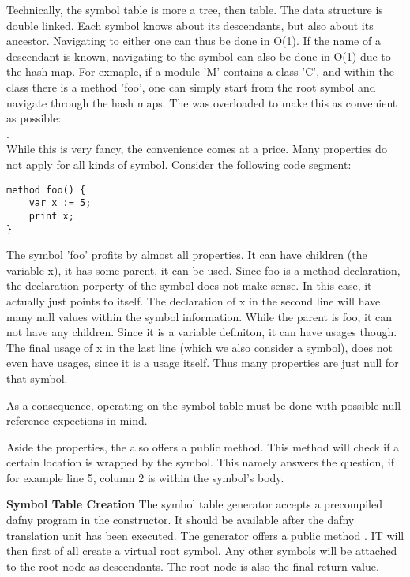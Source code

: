 Technically, the symbol table is more a tree, then table. The data structure is double linked. Each symbol knows about its descendants, but also about its ancestor. Navigating to either one can thus be done in O(1). If the name of a descendant is known, navigating to the symbol can also be done in O(1) due to the hash map. For exmaple, if a module 'M' contains a class 'C', and within the class there is a method 'foo', one can simply start from the root symbol and navigate through the hash maps. The \code{[]} was overloaded to make this as convenient as possible:\\
.\\

While this is very fancy, the convenience comes at a price. Many properties do not apply for all kinds of symbol. Consider the following code segment:

\begin{lstlisting}[language=dafny, caption={Example Code Regarding Symbol Information}, captionpos=b, label={lst:aldbkajds}]
method foo() {
    var x := 5;
    print x;
}
\end{lstlisting}

The symbol 'foo' profits by almost all properties. It can have children (the variable x), it has some parent, it can be used. Since foo is a method declaration, the declaration porperty of the symbol does not make sense. In this case, it actually just points to itself. The declaration of x in the second line will have many null values within the symbol information. While the parent is foo, it can not have any children. Since it is a variable definiton, it can have usages though. The final usage of x in the last line (which we also consider a symbol), does not even have usages, since it is a usage itself. Thus many properties are just null for that symbol.

As a consequence, operating on the symbol table must be done with possible null reference expections in mind.

Aside the properties, the  also offers a public method. This method will check if a certain location is wrapped by the symbol. This namely answers the question, if for example line 5, column 2 is within the symbol's body.

\textbf{Symbol Table Creation}
The symbol table generator accepts a precompiled dafny program in the constructor. It should be available after the dafny translation unit has been executed. The generator offers a public method . IT will then first of all create a virtual root symbol. Any other symbols will be attached to the root node as descendants. The root node is also the final return value.\\

